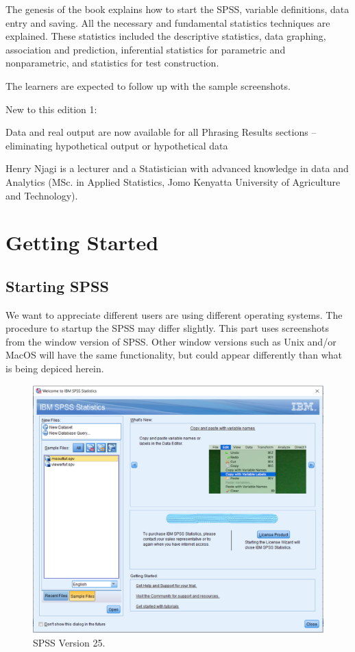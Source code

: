 \documentclass[
]{book}
\begin{document}
The genesis of the book explains how to start the SPSS, variable definitions, data entry and saving. All the necessary and fundamental statistics techniques are explained. These statistics included the descriptive statistics, data graphing, association and prediction, inferential statistics for parametric and nonparametric, and statistics for test construction.

The learners are expected to follow up with the sample screenshots.

New to this edition 1:

Data and real output are now available for all Phrasing Results sections -- eliminating hypothetical output or hypothetical data

Henry Njagi is a lecturer and a Statistician with advanced knowledge in data and Analytics (MSc. in Applied Statistics, Jomo Kenyatta University of Agriculture and Technology).

\hypertarget{getting-started}{%
\chapter{Getting Started}\label{getting-started}}

\hypertarget{starting-spss}{%
\section{Starting SPSS}\label{starting-spss}}

We want to appreciate different users are using different operating systems. The procedure to startup the SPSS may differ slightly.
This part uses screenshots from the window version of SPSS. Other window versions such as Unix and/or MacOS will have the same functionality, but could appear differently than what is being depiced herein.

\begin{figure}
\centering
\includegraphics{getstarted.png}
\caption{SPSS Version 25.}
\end{figure}
\end{document}
